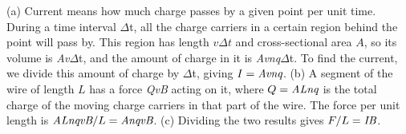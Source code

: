 (a) Current means how much charge passes by a given
point per unit time. During a time interval $\Delta $t, all
the charge carriers in a certain region behind the point
will pass by. This region has length $v\Delta t$ and
cross-sectional area $A$, so its volume is \emph{Av}$\Delta
$t, and the amount of charge in it is \emph{Avnq}$\Delta $t.
To find the current, we divide this amount of charge by
$\Delta $t, giving $I=\emph{Avnq}$. (b) A segment of the
wire of length $L$ has a force \emph{QvB} acting on it,
where $Q=\emph{ALnq}$ is the total charge of the moving
charge carriers in that part of the wire. The force per unit
length is $\emph{ALnqvB}/L=\emph{AnqvB}$. (c) Dividing the
two results gives $F/L=\emph{IB}$.



